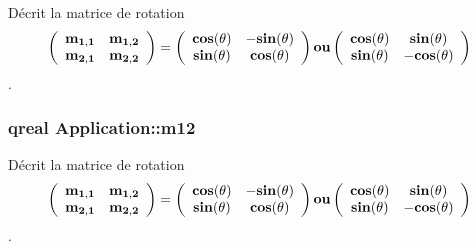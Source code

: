 Décrit la matrice de rotation \[ \bf \left( \begin{array}{ccc} \bf m_{1,1} & \bf m_{1,2} \\ \bf m_{2,1} & \bf m_{2,2} \\ \end{array} \bf\right) \bf= \bf\left( \begin{array}{ccc} \bf cos(\bf\theta) & \bf -sin(\bf\theta) \\ \bf sin(\bf\theta) & \bf cos(\bf\theta) \\ \end{array} \bf\right) \bf ou \bf\left( \begin{array}{ccc} \bf cos(\bf\theta) & \bf sin(\bf\theta) \\ \bf sin(\bf\theta) & \bf -cos(\bf\theta) \\ \end{array} \bf\right) \]. 

\hypertarget{class_application_a6c1095602143845a433dc1c2232479c8}{}
\subsubsection[{m12}]{\setlength{\rightskip}{0pt plus 5cm}qreal Application\+::m12\hspace{0.3cm}{\ttfamily [protected]}}\label{class_application_a6c1095602143845a433dc1c2232479c8}


Décrit la matrice de rotation \[ \bf \left( \begin{array}{ccc} \bf m_{1,1} & \bf m_{1,2} \\ \bf m_{2,1} & \bf m_{2,2} \\ \end{array} \bf\right) \bf= \bf\left( \begin{array}{ccc} \bf cos(\bf\theta) & \bf -sin(\bf\theta) \\ \bf sin(\bf\theta) & \bf cos(\bf\theta) \\ \end{array} \bf\right) \bf ou \bf\left( \begin{array}{ccc} \bf cos(\bf\theta) & \bf sin(\bf\theta) \\ \bf sin(\bf\theta) & \bf -cos(\bf\theta) \\ \end{array} \bf\right) \]. 

\hypertarget{class_application_a57f2364c5671f6ade315024cff46c975}{}
